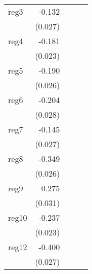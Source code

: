 {\begin{longtable}{l*{4}{D{.}{.}{-1}}}
\addlinespace
reg3        &      -0.132\sym{***}&                     &                     &                     \\
            &     (0.027)         &                     &                     &                     \\
\addlinespace
reg4        &      -0.181\sym{***}&                     &                     &                     \\
            &     (0.023)         &                     &                     &                     \\
\addlinespace
reg5        &      -0.190\sym{***}&                     &                     &                     \\
            &     (0.026)         &                     &                     &                     \\
\addlinespace
reg6        &      -0.204\sym{***}&                     &                     &                     \\
            &     (0.028)         &                     &                     &                     \\
\addlinespace
reg7        &      -0.145\sym{***}&                     &                     &                     \\
            &     (0.027)         &                     &                     &                     \\
\addlinespace
reg8        &      -0.349\sym{***}&                     &                     &                     \\
            &     (0.026)         &                     &                     &                     \\
\addlinespace
reg9        &       0.275\sym{***}&                     &                     &                     \\
            &     (0.031)         &                     &                     &                     \\
\addlinespace
reg10       &      -0.237\sym{***}&                     &                     &                     \\
            &     (0.023)         &                     &                     &                     \\
\addlinespace
reg12       &      -0.400\sym{***}&                     &                     &                     \\
            &     (0.027)         &                     &                     &                     \\

\end{longtable}}
